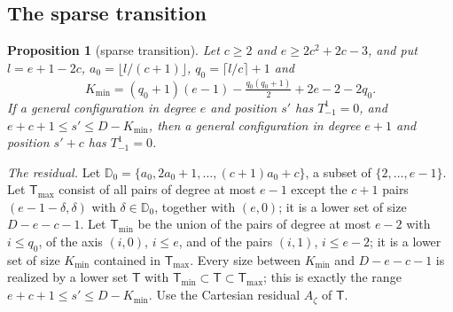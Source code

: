 \documentclass{amsart}
\newtheorem{proposition}[theorem]{Proposition}
\theoremstyle{definition}
\theoremstyle{remark}
\numberwithin{equation}{section}
\begin{document}
\subsection{The sparse transition}
\begin{proposition}[sparse transition]\label{prop:gateA}
Let $c\ge2$ and $e\ge2c^2+2c-3$, and put $l=e+1-2c$, $a_0=\lfloor l/(c+1)\rfloor$,
$q_0=\lceil l/c\rceil+1$ and
\[
  K_{\min}=(q_0+1)(e-1)-\tfrac{q_0(q_0+1)}2+2e-2-2q_0 .
\]
If a general configuration in degree $e$ and position $s'$ has $T^1_{-1}=0$, and
$e+c+1\le s'\le D-K_{\min}$, then a general configuration in degree $e+1$ and position
$s'+c$ has $T^1_{-1}=0$.
\end{proposition}

\emph{The residual.} Let $\mathbb D_0=\{a_0,2a_0+1,\dots,(c+1)a_0+c\}$, a subset of
$\{2,\dots,e-1\}$. Let $\mathsf T_{\max}$ consist of all pairs of degree at most $e-1$
except the $c+1$ pairs $(e-1-\delta,\delta)$ with $\delta\in\mathbb D_0$, together with
$(e,0)$; it is a lower set of size $D-e-c-1$. Let $\mathsf T_{\min}$ be the union of the
pairs of degree at most $e-2$ with $i\le q_0$, of the axis $(i,0)$, $i\le e$, and of the
pairs $(i,1)$, $i\le e-2$; it is a lower set of size $K_{\min}$ contained in
$\mathsf T_{\max}$. Every size between $K_{\min}$ and $D-e-c-1$ is realized by a lower set
$\mathsf T$ with $\mathsf T_{\min}\subset\mathsf T\subset\mathsf T_{\max}$; this is
exactly the range $e+c+1\le s'\le D-K_{\min}$. Use the Cartesian residual $A_\zeta$ of
$\mathsf T$.
\end{document}
